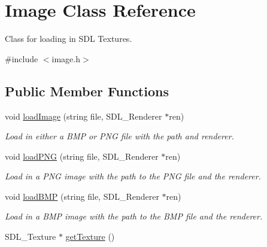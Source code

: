 \hypertarget{classImage}{}\section{Image Class Reference}
\label{classImage}


Class for loading in S\+DL Textures.  




{\ttfamily \#include $<$image.\+h$>$}

\subsection*{Public Member Functions}
\begin{DoxyCompactItemize}
\item 
void \hyperlink{classImage_a776ab55f3884f994512aa092cd7fa250}{load\+Image} (string file, S\+D\+L\+\_\+\+Renderer $\ast$ren)\hypertarget{classImage_a776ab55f3884f994512aa092cd7fa250}{}\label{classImage_a776ab55f3884f994512aa092cd7fa250}

\begin{DoxyCompactList}\small\item\em Load in either a B\+MP or P\+NG file with the path and renderer. \end{DoxyCompactList}\item 
void \hyperlink{classImage_ab00c4a53e3154287075c956c805e1cb1}{load\+P\+NG} (string file, S\+D\+L\+\_\+\+Renderer $\ast$ren)\hypertarget{classImage_ab00c4a53e3154287075c956c805e1cb1}{}\label{classImage_ab00c4a53e3154287075c956c805e1cb1}

\begin{DoxyCompactList}\small\item\em Load in a P\+NG image with the path to the P\+NG file and the renderer. \end{DoxyCompactList}\item 
void \hyperlink{classImage_ad37ad8bd7d9572be7fbbd921a299d235}{load\+B\+MP} (string file, S\+D\+L\+\_\+\+Renderer $\ast$ren)\hypertarget{classImage_ad37ad8bd7d9572be7fbbd921a299d235}{}\label{classImage_ad37ad8bd7d9572be7fbbd921a299d235}

\begin{DoxyCompactList}\small\item\em Load in a B\+MP image with the path to the B\+MP file and the renderer. \end{DoxyCompactList}\item 
S\+D\+L\+\_\+\+Texture $\ast$ \hyperlink{classImage_a6312e473b9315c6db49fbd284b5cf81a}{get\+Texture} ()\hypertarget{classImage_a6312e473b9315c6db49fbd284b5cf81a}{}\label{classImage_a6312e473b9315c6db49fbd284b5cf81a}


\end{DoxyCompactItemize}

